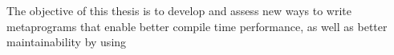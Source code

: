 \documentclass[main]{subfiles}
\begin{document}





The objective of this thesis is to develop and assess new ways to write
\cpp metaprograms that enable better compile time performance, as well as
better maintainability by using


\end{document}
